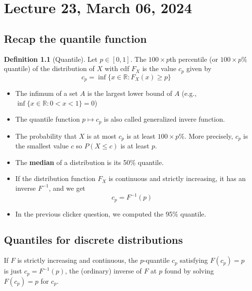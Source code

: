 \documentclass[
]{book}
\providecommand{\tightlist}{%
  \setlength{\itemsep}{0pt}\setlength{\parskip}{0pt}}
\theoremstyle{definition}
\newtheorem{definition}{Definition}[chapter]
\theoremstyle{definition}
\theoremstyle{definition}
\theoremstyle{definition}
\theoremstyle{remark}
\begin{document}
\chapter{Lecture 23, March 06, 2024}\label{lecture-23-march-06-2024}

\newcommand{\var}{\mathbb{V}ar}
\newcommand{\R}{\mathbb{R}}
\newcommand{\E}{\mathbb{E}}

\section{Recap the quantile function}\label{recap-the-quantile-function}

\begin{definition}[Quantile]
Let \(p\in[0,1]\). The \(100\times p\)th percentile (or \(100\times p\%\) quantile) of the distribution of \(X\) with cdf \(F_X\) is the value \(c_p\) given by
\[ c_p = \inf\{x\in\mathbb{R}: F_X(x) \geq p \}\]
\end{definition}

\begin{itemize}
\tightlist
\item
  The infimum of a set \(A\) is the largest lower bound of \(A\) (e.g., \(\inf\{x\in\mathbb{R}: 0<x<1\}=0\))
\item
  The quantile function \(p\mapsto c_p\) is also called generalized invere function.
\item
  The probability that \(X\) is at most \(c_p\) is at least \(100\times p\)\%. More precisely, \(c_p\) is the smallest value \(c\) so \(P(X\leq c)\) is at least \(p\).
\item
  The \textbf{median} of a distribution is its 50\% quantile.
\item
  If the distribution function \(F_X\) is continuous and strictly increasing, it has an inverse \(F^{-1}\), and we get
  \[ c_p = F^{-1}(p)\]
\item
  In the previous clicker question, we computed the 95\% quantile.
\end{itemize}

\section{Quantiles for discrete distributions}\label{quantiles-for-discrete-distributions}

If \(F\) is strictly increasing and continuous, the \(p\)-quantile \(c_p\) satisfying \(F(c_p)=p\) is just \(c_p=F^{-1}(p)\), the (ordinary) inverse of \(F\) at \(p\) found by solving \(F(c_p)=p\) for \(c_p\).
\end{document}
